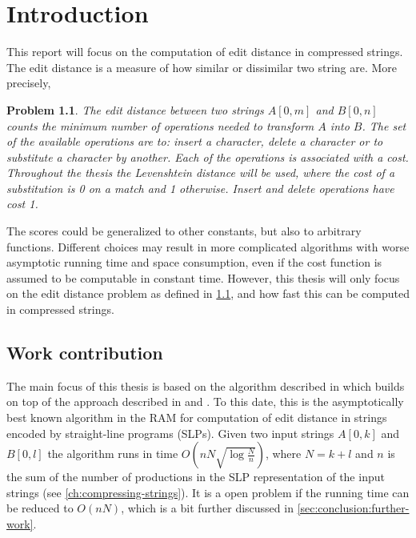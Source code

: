 \documentclass[twoside,11pt,openright]{report}
\newcommand{\str}[3]{#1[#2, #3]}
\newtheorem{problem}{Problem}
\begin{document}
\chapter{Introduction}
\label{ch:intro}

This report will focus on the computation of edit distance in compressed strings. The edit distance is a measure of how similar or dissimilar two string are. More precisely,
\begin{problem}
  \label{problem:edit-distance}
  The edit distance between two strings $\str{A}{0}{m}$ and $\str{B}{0}{n}$ counts the minimum number of operations needed to transform $A$ into $B$. The set of the available operations are to: insert a character, delete a character or to substitute a character by another. Each of the operations is associated with a cost. Throughout the thesis the Levenshtein distance will be used, where the cost of a substitution is 0 on a match and 1 otherwise. Insert and delete operations have cost 1.
\end{problem}

The scores could be generalized to other constants, but also to arbitrary functions. Different choices may result in more complicated algorithms with worse asymptotic running time and space consumption, even if the cost function is assumed to be computable in constant time. However, this thesis will only focus on the edit distance problem as defined in \cref{problem:edit-distance}, and how fast this can be computed in compressed strings.

\section{Work contribution}
The main focus of this thesis is based on the algorithm described in \cite{Gawrychowski:2012:FAC:2422024.2422048} which builds on top of the approach described in \cite{DBLP:journals/corr/abs-1004-1194} and \cite{DBLP:journals/corr/abs-0707-3619}. To this date, this is the asymptotically best known algorithm in the RAM for computation of edit distance in strings encoded by straight-line programs (SLPs). Given two input strings $\str{A}{0}{k}$ and $\str{B}{0}{l}$ the algorithm runs in time $O(n N \sqrt{\log{\frac{N}{n}}})$, where $N = k + l$ and $n$ is the sum of the number of productions in the SLP representation of the input strings (see \cref{ch:compressing-strings}). It is a open problem if the running time can be reduced to $O(nN)$, which is a bit further discussed in \cref{sec:conclusion:further-work}.
\end{document}
